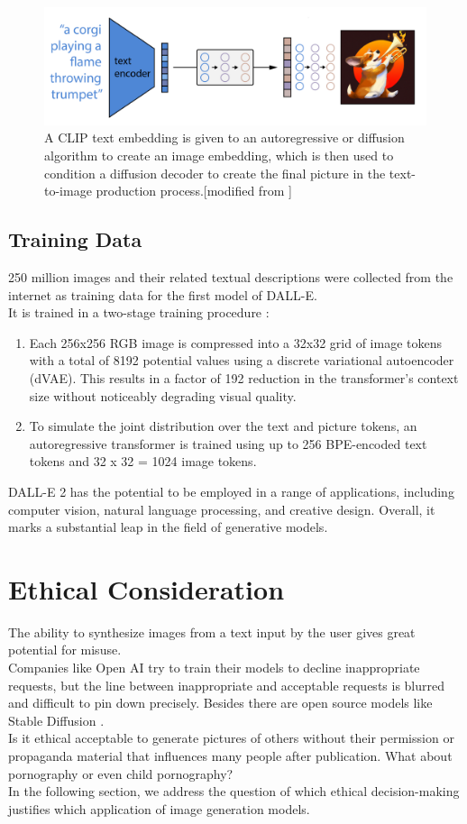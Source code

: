 \documentclass[11pt]{article}
\begin{document}
\begin{figure} [h]
	\includegraphics[width = 1\linewidth]{images/highLevel.png}
	\caption{A CLIP text embedding is given to an autoregressive or diffusion algorithm to create an image embedding, which is then used to condition a diffusion decoder to create the final picture in the text-to-image production process.[modified from \cite{CLIP}]}
	\label{example}
\end{figure}

\subsection{Training Data}
250 million images and their related textual descriptions were collected from the internet as training data for the first model of DALL-E.\\
It is trained in a two-stage training procedure \cite{zeroShot}:
\begin{enumerate}
	\item Each 256x256 RGB image is compressed into a 32x32 grid of image tokens with a total of 8192 potential values using a discrete variational autoencoder (dVAE). This results in a factor of 192 reduction in the transformer's context size without noticeably degrading visual quality.
	\item To simulate the joint distribution over the text and picture tokens, an autoregressive transformer is trained using up to 256 BPE-encoded text tokens and 32 x 32 = 1024 image tokens.
\end{enumerate}
DALL-E 2 has the potential to be employed in a range of applications, including computer vision, natural language processing, and creative design. Overall, it marks a substantial leap in the field of generative models.


\section{Ethical Consideration}
The ability to synthesize images from a text input by the user gives great potential for misuse. \\
Companies like Open AI try to train their models to decline inappropriate requests, but the line between inappropriate and acceptable requests is blurred and difficult to pin down precisely. Besides there are open source models like Stable Diffusion \cite{StableDiffusion}.\\
Is it ethical acceptable to generate pictures of others without their permission or propaganda material that influences many people after publication. What about pornography or even child pornography?\\
In the following section, we address the question of which ethical decision-making justifies which application of image generation models.
\end{document}
